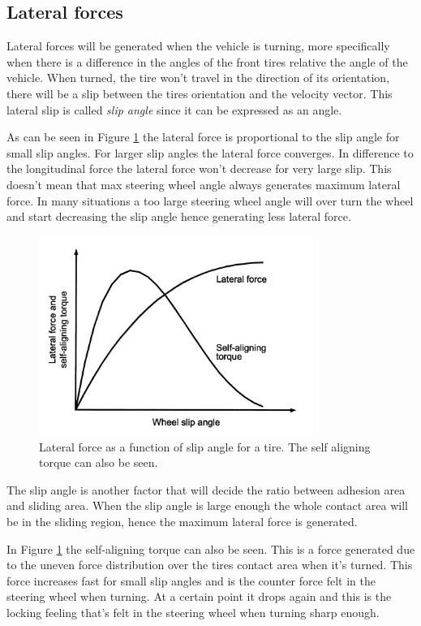 \subsection{Lateral forces}
Lateral forces will be generated when the vehicle is turning, more specifically when there is a difference in the angles of the front tires relative the angle of the vehicle. When turned, the tire won't travel in the direction of its orientation, there will be a slip between the tires orientation and the velocity vector. This lateral slip is called \textit{slip angle} since it can be expressed as an angle.

As can be seen in Figure \ref{slipangle_latforce} the lateral force is proportional to the slip angle for small slip angles. For larger slip angles the lateral force converges. In difference to the longitudinal force the lateral force won't decrease for very large slip. This doesn't mean that max steering wheel angle always generates maximum lateral force. In many situations a too large steering wheel angle will over turn the wheel and start decreasing the slip angle hence generating less lateral force.
\begin{figure}[h]
	\centering
	\includegraphics[width=0.8\textwidth]{Pictures/slipangle_latforce}
	\caption{Lateral force as a function of slip angle for a tire. The self aligning torque can also be seen. \cite{sae2004}}
	\label{slipangle_latforce}
\end{figure}

The slip angle is another factor that will decide the ratio between adhesion area and sliding area. When the slip angle is large enough the whole contact area will be in the sliding region, hence the maximum lateral force is generated.

In Figure \ref{slipangle_latforce} the self-aligning torque can also be seen. This is a force generated due to the uneven force distribution over the tires contact area when it's turned. This force increases fast for small slip angles and is the counter force felt in the steering wheel when turning. At a certain point it drops again and this is the locking feeling that's felt in the steering wheel when turning sharp enough.

